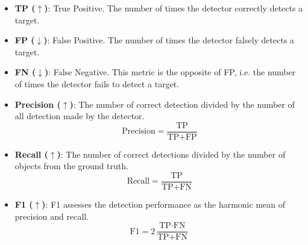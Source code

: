 \begin{itemize}

\item \textbf{TP ($\uparrow$)}: True Positive. The number of times the detector correctly detects a target. 

\item \textbf{FP ($\downarrow$)}: False Positive. The number of times the detector falsely detects a target.

\item \textbf{FN ($\downarrow$)}: False Negative. This metric is the opposite of FP, i.e. the number of times the detector fails to detect a target.

\item \textbf{Precision ($\uparrow$)}: The number of correct detection divided by the number of all detection made by the detector.
\begin{equation}
\text{Precision} = \frac{\text{TP}}{\text{TP} + \text{FP}}
\label{eqn:Precision}
\end{equation}

\item \textbf{Recall ($\uparrow$)}: The number of correct detections divided by the number of objects from the ground truth.
\begin{equation}
\text{Recall} = \frac{\text{TP}}{\text{TP} + \text{FN}}
\label{eqn:Recall}
\end{equation}

\item \textbf{F1 ($\uparrow$)}: F1 assesses the detection performance as the harmonic mean of precision and recall.
\begin{equation}
\text{F1} = 2\frac{\text{TP} \cdot \text{FN}}{\text{TP} + \text{FN}}
\label{eqn:F1}
\end{equation}


\end{itemize}
